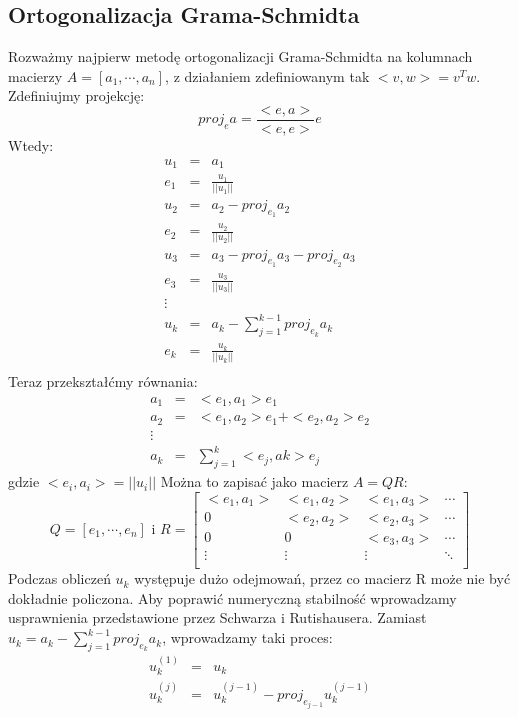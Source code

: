 \documentclass[a4paper,10pt]{article}
\begin{document}
	\subsection{Ortogonalizacja Grama-Schmidta}
		Rozważmy najpierw metodę ortogonalizacji Grama-Schmidta na kolumnach macierzy $A = [a_1,\cdots, a_n]$,
		z działaniem zdefiniowanym tak $<v,w> = v^Tw$.
		Zdefiniujmy projekcję:
		\begin{equation}
			proj_e a = \frac {<e,a>} {<e,e>} e
		\end{equation}
		Wtedy:
		\begin{eqnarray*}
			u_1 & = & a_1\\
			e_1 & = &\frac {u_1} {||u_1||} \\
			u_2 & = & a_2 - proj_{e_1} a_2 \\
			e_2 & = & \frac {u_2} {||u_2||} \\
			u_3 & = & a_3 - proj_{e_1} a_3 - proj_{e_2} a_3 \\
			e_3 & = & \frac {u_3} {||u_3||} \\
			\vdots\\
			u_k & = & a_k - \sum_{j=1}^{k-1} proj_{e_k} a_k \\
			e_k & = & \frac {u_k} {||u_k||} \\
		\end{eqnarray*}
		Teraz przekształćmy równania:
		\begin{eqnarray*}
		a_1 & = & <e_1,a_1>e_1\\
		a_2 & = & <e_1,a_2>e_1 + <e_2,a_2>e_2\\
		\vdots\\
		a_k & = & \sum_{j=1}^{k} <e_j,ak>e_j
		\end{eqnarray*}
		gdzie $<e_i,a_i> = ||u_i||$
		Można to zapisać jako macierz $A = QR$:
		\begin{equation}
			Q = [e_1,\cdots,e_n]\mbox{ i } R= \left[ \begin{array}{ccccccccc}
		<e_1,a_1> & <e_1,a_2> & <e_1,a_3> & \cdots\\
		0	  & <e_2,a_2> & <e_2,a_3> & \cdots\\
		0         & 0         & <e_3,a_3> & \cdots\\
		\vdots    & \vdots    & \vdots    & \ddots\\
		\end{array} \right]
		\end{equation}
		Podczas obliczeń $u_k$ występuje dużo odejmowań, przez co macierz R może nie być dokładnie policzona.
		Aby poprawić numeryczną stabilność wprowadzamy usprawnienia przedstawione przez Schwarza i Rutishausera.
		Zamiast $u_k = a_k - \sum_{j=1}^{k-1} proj_{e_k} a_k$, wprowadzamy taki proces:
		\begin{eqnarray*}
		u_k^{(1)} & = & u_k\\
		u_k^{(j)} & = & u_k^{(j-1)} - proj_{e_{j-1}} u_k^{(j-1)}\\
		\end{eqnarray*}
\end{document}
